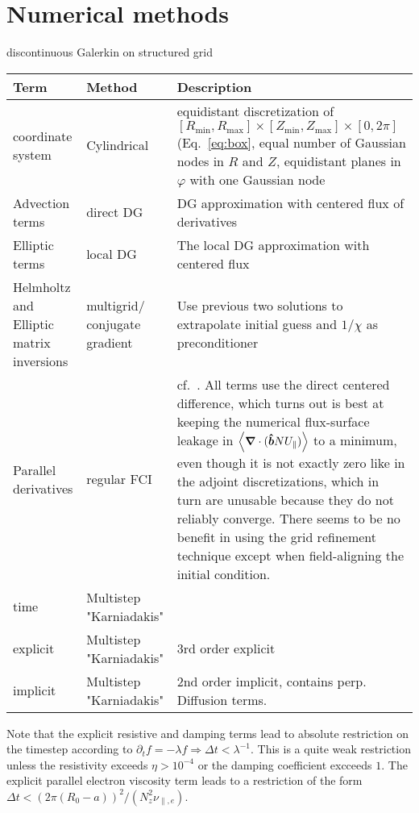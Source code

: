 \section{Numerical methods}
discontinuous Galerkin on structured grid
\begin{longtable}{p{3cm}p{3cm}p{8cm}}
\toprule
\rowcolor{gray!50}\textbf{Term} &  \textbf{Method} & \textbf{Description}  \\ \midrule
    coordinate system & Cylindrical & equidistant discretization of $[R_{\min},R_{\max}] \times [Z_{\min},Z_{\max}] \times [0,2\pi]$ (Eq.~\eqref{eq:box}, equal number of Gaussian nodes in $R$ and $Z$, equidistant planes in $\varphi$ with one Gaussian node \\
Advection terms & direct DG & DG approximation with centered flux of derivatives \\
Elliptic terms & local DG & The local DG approximation with centered flux \\
Helmholtz and Elliptic matrix inversions & multigrid/ conjugate gradient & Use previous two solutions to extrapolate initial guess and $1/\chi$ as preconditioner \\
Parallel derivatives & regular  FCI & cf.~\cite{Held2016,Stegmeir2017}.
All terms use the direct centered difference, which turns out is best
at keeping the numerical flux-surface leakage in $\left \langle {\boldsymbol{\nabla}}\cdot ( \bm{\hat{b}} NU_\parallel) \right \rangle$ to a minimum, even
though it is not exactly zero like in the adjoint discretizations, which in turn are unusable because they do not reliably converge.
There seems to be no benefit in using the grid refinement technique except when field-aligning the initial condition.
\\
time & Multistep "Karniadakis" & \\
\qquad explicit & Multistep "Karniadakis" & $3$rd order explicit\\
\qquad implicit & Multistep "Karniadakis" & $2$nd order implicit, contains perp. Diffusion terms. \\
\bottomrule
\end{longtable}
Note that the explicit resistive and damping terms lead to absolute restriction
on the timestep according to $\partial_t f = -\lambda f \Rightarrow \Delta t < \lambda^{-1}$. This is a quite weak restriction unless the resistivity exceeds $\eta > 10^{-4}$ or the damping coefficient excceeds $1$.
The explicit parallel electron viscosity term leads to a restriction of the
form $\Delta t < (2\pi (R_0 - a))^2/(N_z^2 \nu_{\parallel,e})$.

